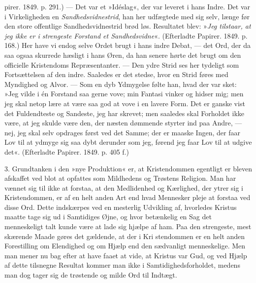 \documentclass[12pt,a4paper,openany]{book}
\newcommand{\opage}[1]{\marginnote{\footnotesize\textit{[#1]}}}
\begin{document}
\opage{134}pirer. 1849. p. 291.) --- Det var et »Idéslag«, der var
leveret i hans Indre. Det var i Virkeligheden en \textit{Sandhedsvidnestrid},
han her udfægtede med sig selv, længe
før den store offentlige Sandhedsvidnestrid brød løs. Resultatet
blev: »\textit{Jeg tilstaar, at jeg ikke er i strengeste
Forstand et Sandhedsvidne}«. (Efterladte Papirer. 1849.
p. 168.) Her have vi endog selve Ordet brugt i hans
indre Debat, --- det Ord, der da saa ogsaa skurrede hæsligt
i hans Øren, da han senere hørte det brugt om den
officielle Kristendoms Repræsentanter. --- Den ydre Strid
ses her tydeligt som Fortsættelsen af den indre. Saaledes
er det stedse, hvor en Strid føres med Myndighed og
Alvor. --- Som en dyb Ydmygelse følte han, hvad der
var sket: »Jeg vilde i én Forstand saa gerne vove; min
Fantasi vinker og hidser mig; men jeg skal netop lære
at være saa god at vove i en lavere Form. Det er ganske
vist det Fuldendteste og Sandeste, jeg har skrevet; men
saaledes skal Forholdet ikke være, at jeg skulde være
den, der næsten dømmende styrter ind paa Andre, ---
nej, jeg skal selv opdrages først ved det Samme; der er
maaske Ingen, der faar Lov til at ydmyge sig saa dybt
derunder som jeg, førend jeg faar Lov til at udgive det«.
(Efterladte Papirer. 1849. p. 405 f.)

3. Grundtanken i den »nye Produktion« er, at Kristendommen
egentligt er bleven afskaffet ved blot at opfattes
som Mildhedens og Trøstens Religion. Man har
vænnet sig til ikke at forstaa, at den Medlidenhed og
Kærlighed, der ytrer sig i Kristendommen, er af en helt
anden Art end hvad Mennesker pleje at forstaa ved disse
Ord. Dette indskærpes ved en mesterlig Udvikling af,
hvorledes Kristus maatte tage sig ud i Samtidiges Øjne,
og hvor betænkelig en Sag det menneskeligt talt kunde
være at lade sig hjælpe af ham. Paa den strengeste,
mest skærende Maade gøres det gældende, at der i Kri%
\opage{135}stendommen er en helt anden Forestilling om Elendighed
og om Hjælp end den sædvanligt menneskelige. Men
man mener nu bag efter at have faaet at vide, at Kristus
var Gud, og ved Hjælp af dette tilsnegne Resultat
kommer man ikke i Samtidighedsforholdet, medens man
dog tager sig de trøstende og milde Ord til Indtægt.
\end{document}
